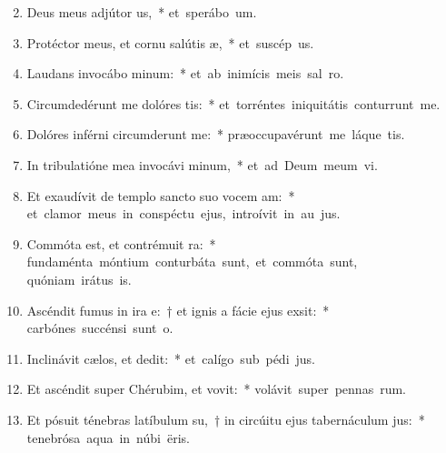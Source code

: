 \begin{flushleft}
\begin{enumerate}[leftmargin=*]
\setcounter{enumi}{1}

\item Deus meus adjútor us,~* \mbox{et sperábo  um.}

\item Protéctor meus, et cornu salútis æ,~* \mbox{et suscép us.}

\item Laudans invocábo minum:~* \mbox{et ab inimícis meis sal ro.}

\item Circumdedérunt me dolóres tis:~* \mbox{et torréntes iniquitátis conturrunt me.}

\item Dolóres inférni circumderunt me:~* \mbox{præoccupavérunt me láque tis.}

\item In tribulatióne mea invocávi minum,~* \mbox{et ad Deum meum vi.}

\item Et exaudívit de templo sancto suo vocem am:~* \mbox{et clamor meus in conspéctu ejus, introívit in au jus.}

\item Commóta est, et contrémuit ra:~* \mbox{fundaménta móntium conturbáta sunt, et commóta sunt,} \mbox{quóniam irátus  is.}

\item Ascéndit fumus in ira e:~† et ignis a fácie ejus exsit:~* \mbox{carbónes succénsi sunt  o.}

\item Inclinávit cælos, et dedit:~* \mbox{et calígo sub pédi jus.}

\item Et ascéndit super Chérubim, et vovit:~* \mbox{volávit super pennas rum.}

\item Et pósuit ténebras latíbulum su,~† in circúitu ejus tabernáculum jus:~* \mbox{tenebrósa aqua in núbi ëris.}


\end{enumerate}
\end{flushleft}
